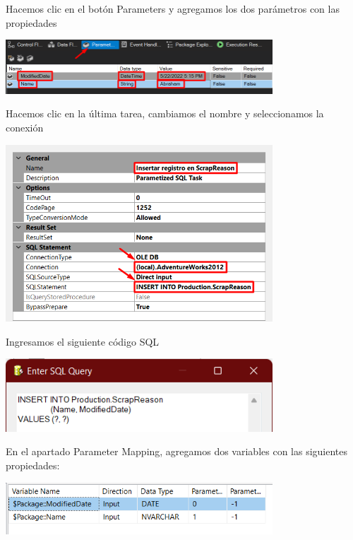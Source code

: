 \documentclass[12pt,letterpaper]{article}
\begin{document}
Hacemos clic en el botón Parameters y agregamos los dos parámetros con las propiedades

\begin{center}
    \includegraphics[width=10cm]{./img/img41.png}
\end{center}

Hacemos clic en la última tarea, cambiamos el nombre y seleccionamos la conexión

\begin{center}
    \includegraphics[width=10cm]{./img/img38.png}
\end{center}

Ingresamos el siguiente código SQL

\begin{center}
    \includegraphics[width=10cm]{./img/img39.png}
\end{center}

En el apartado Parameter Mapping, agregamos dos variables con las siguientes propiedades: 

\begin{center}
    \includegraphics[width=10cm]{./img/img40.png}
\end{center}
\end{document}
